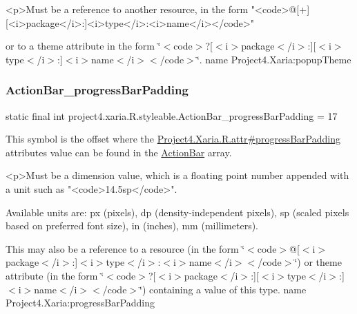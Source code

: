 \begin{DoxyVerb}      <p>Must be a reference to another resource, in the form "<code>@[+][<i>package</i>:]<i>type</i>:<i>name</i></code>"
\end{DoxyVerb}
 or to a theme attribute in the form \char`\"{}$<$code$>$?\mbox{[}$<$i$>$package$<$/i$>$\+:\mbox{]}\mbox{[}$<$i$>$type$<$/i$>$\+:\mbox{]}$<$i$>$name$<$/i$>$$<$/code$>$\char`\"{}.  name Project4.\+Xaria\+:popup\+Theme \mbox{\label{classproject4_1_1xaria_1_1R_1_1styleable_a99f4af768ba3206b1224f0599aad5fd3}} 
\subsubsection{\texorpdfstring{Action\+Bar\+\_\+progress\+Bar\+Padding}{ActionBar\_progressBarPadding}}
{\footnotesize\ttfamily static final int project4.\+xaria.\+R.\+styleable.\+Action\+Bar\+\_\+progress\+Bar\+Padding = 17\hspace{0.3cm}{\ttfamily [static]}}

This symbol is the offset where the \hyperlink{}{Project4.\+Xaria.\+R.\+attr\#progress\+Bar\+Padding} attribute\textquotesingle{}s value can be found in the \hyperlink{classproject4_1_1xaria_1_1R_1_1styleable_accb530194c58ee3abb15587da8869e99}{Action\+Bar} array.

\begin{DoxyVerb}      <p>Must be a dimension value, which is a floating point number appended with a unit such as "<code>14.5sp</code>".
\end{DoxyVerb}
 Available units are\+: px (pixels), dp (density-\/independent pixels), sp (scaled pixels based on preferred font size), in (inches), mm (millimeters). 

This may also be a reference to a resource (in the form \char`\"{}$<$code$>$@\mbox{[}$<$i$>$package$<$/i$>$\+:\mbox{]}$<$i$>$type$<$/i$>$\+:$<$i$>$name$<$/i$>$$<$/code$>$\char`\"{}) or theme attribute (in the form \char`\"{}$<$code$>$?\mbox{[}$<$i$>$package$<$/i$>$\+:\mbox{]}\mbox{[}$<$i$>$type$<$/i$>$\+:\mbox{]}$<$i$>$name$<$/i$>$$<$/code$>$\char`\"{}) containing a value of this type.  name Project4.\+Xaria\+:progress\+Bar\+Padding \mbox{\label{classproject4_1_1xaria_1_1R_1_1styleable_ae3f1ea6ff103725e559077f1effcb813}} 
